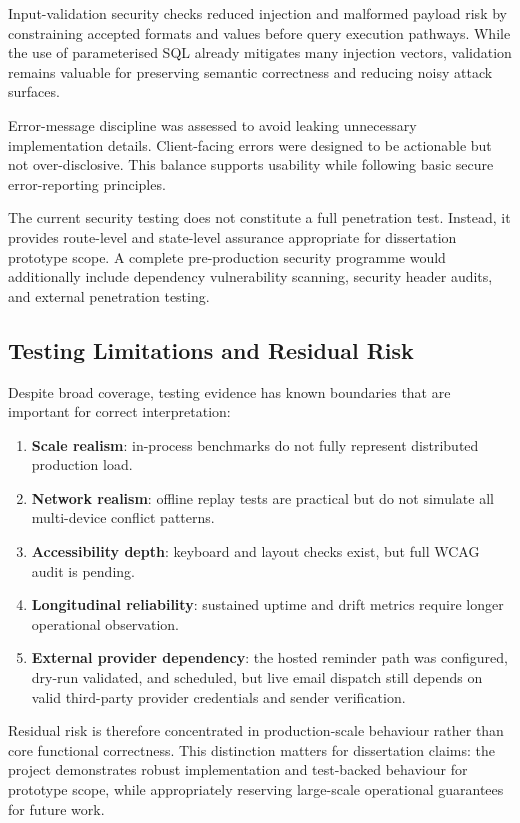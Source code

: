 \documentclass[12pt]{article}
\begin{document}
Input-validation security checks reduced injection and malformed payload risk by constraining accepted formats and values before query execution pathways. While the use of parameterised SQL already mitigates many injection vectors, validation remains valuable for preserving semantic correctness and reducing noisy attack surfaces.

Error-message discipline was assessed to avoid leaking unnecessary implementation details. Client-facing errors were designed to be actionable but not over-disclosive. This balance supports usability while following basic secure error-reporting principles.

The current security testing does not constitute a full penetration test. Instead, it provides route-level and state-level assurance appropriate for dissertation prototype scope. A complete pre-production security programme would additionally include dependency vulnerability scanning, security header audits, and external penetration testing.

\subsection{Testing Limitations and Residual Risk}
Despite broad coverage, testing evidence has known boundaries that are important for correct interpretation:
\begin{enumerate}
    \item \textbf{Scale realism}: in-process benchmarks do not fully represent distributed production load.
    \item \textbf{Network realism}: offline replay tests are practical but do not simulate all multi-device conflict patterns.
    \item \textbf{Accessibility depth}: keyboard and layout checks exist, but full WCAG audit is pending.
    \item \textbf{Longitudinal reliability}: sustained uptime and drift metrics require longer operational observation.
    \item \textbf{External provider dependency}: the hosted reminder path was configured, dry-run validated, and scheduled, but live email dispatch still depends on valid third-party provider credentials and sender verification.
\end{enumerate}

Residual risk is therefore concentrated in production-scale behaviour rather than core functional correctness. This distinction matters for dissertation claims: the project demonstrates robust implementation and test-backed behaviour for prototype scope, while appropriately reserving large-scale operational guarantees for future work.
\end{document}
